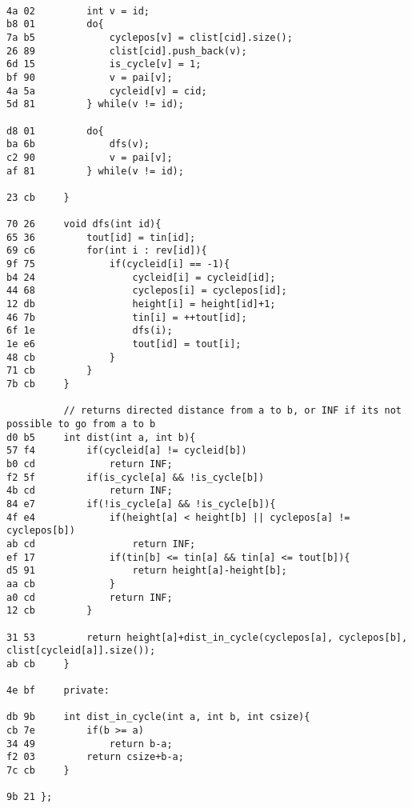 \documentclass[11pt, a4paper, twoside]{article}
\begin{document}
\begin{lstlisting}
      
4a 02         int v = id;
b8 01         do{
7a b5             cyclepos[v] = clist[cid].size();
26 89             clist[cid].push_back(v);
6d 15             is_cycle[v] = 1;
bf 90             v = pai[v];
4a 5a             cycleid[v] = cid;
5d 81         } while(v != id);
      
d8 01         do{
ba 6b             dfs(v);
c2 90             v = pai[v];
af 81         } while(v != id);
      
23 cb     }
      
70 26     void dfs(int id){
65 36         tout[id] = tin[id];
69 c6         for(int i : rev[id]){
9f 75             if(cycleid[i] == -1){
b4 24                 cycleid[i] = cycleid[id];
44 68                 cyclepos[i] = cyclepos[id];
12 db                 height[i] = height[id]+1;
46 7b                 tin[i] = ++tout[id];
6f 1e                 dfs(i);
1e e6                 tout[id] = tout[i];
48 cb             }
71 cb         }
7b cb     }
      
          // returns directed distance from a to b, or INF if its not possible to go from a to b
d0 b5     int dist(int a, int b){
57 f4         if(cycleid[a] != cycleid[b])
b0 cd             return INF;
f2 5f         if(is_cycle[a] && !is_cycle[b])
4b cd             return INF;
84 e7         if(!is_cycle[a] && !is_cycle[b]){
4f e4             if(height[a] < height[b] || cyclepos[a] != cyclepos[b])
ab cd                 return INF;
ef 17             if(tin[b] <= tin[a] && tin[a] <= tout[b]){
d5 91                 return height[a]-height[b];
aa cb             }
a0 cd             return INF;
12 cb         }
      
31 53         return height[a]+dist_in_cycle(cyclepos[a], cyclepos[b], clist[cycleid[a]].size());
ab cb     }
      
4e bf     private:
      
db 9b     int dist_in_cycle(int a, int b, int csize){
cb 7e         if(b >= a)
34 49             return b-a;
f2 03         return csize+b-a;
7c cb     }
      
9b 21 };
\end{lstlisting}
\end{document}
